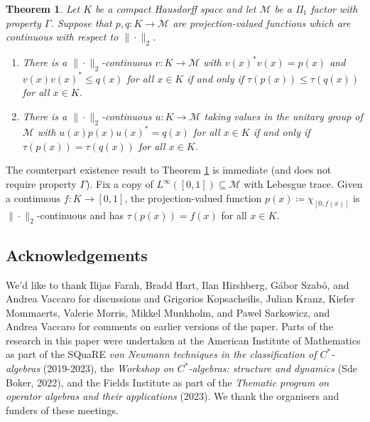 \documentclass[a4paper,11pt]{amsart}
\newtheorem{theorem}{Theorem}
\theoremstyle{definition}
\numberwithin{equation}{section}
\numberwithin{theorem}{section}
\newcommand{\M}{\mathcal{M}}
\DeclareRobustCommand{\SkipTocEntry}[5]{}
\begin{document}
\begin{theorem}\label{IntroThmCtsProj}
Let $K$ be a compact Hausdorff space and let $\M$ be a {\rm II}$_1$ factor with property $\Gamma$.  Suppose that $p,q\colon K\to \M$ are projection-valued functions which are continuous with respect to $\|\cdot\|_2$.
\begin{enumerate}
    \item There is a $\|\cdot\|_2$-continuous $v\colon K\to\M$ with $v(x)^*v(x)=p(x)$ and $v(x)v(x)^*\leq q(x)$ for all $x\in K$ if and only if $\tau(p(x))\leq\tau(q(x))$ for all $x\in K$.  
    \item There is a $\|\cdot\|_2$-continuous $u\colon K\to\M$ taking values in the unitary group of $\M$ with $u(x)p(x)u(x)^*=q(x)$ for all $x\in K$ if and only if $\tau(p(x))=\tau(q(x))$ for all $x\in K$. 
\end{enumerate}
\end{theorem}
The counterpart existence result to Theorem \ref{IntroThmCtsProj} is immediate (and does not require property $\Gamma$). Fix a copy of $L^\infty([0,1])\subseteq \M$ with Lebesgue trace.  Given a continuous $f\colon K\to [0,1]$,  the projection-valued function $p(x)\coloneqq \chi_{[0,f(x)]}$ is $\|\cdot\|_2$-continuous and has $\tau(p(x))=f(x)$ for all $x\in K$.

\subsection*{Acknowledgements}
We'd like to thank Ilijas Farah, Bradd Hart, Ilan Hirshberg, G{\'a}bor Szab{\'o}, and Andrea Vaccaro for discussions and Grigorios Kopsacheilis, Julian Kranz, Kiefer Mommaerts, Valerie Morris, Mikkel Munkholm, and Pawel Sarkowicz, and Andrea Vaccaro for comments on earlier versions of the paper.  Parts of the research in this paper were undertaken at the American Institute of Mathematics as part of the SQuaRE \emph{von Neumann techniques in the classification of $C^*$-algebras} (2019-2023), the \emph{Workshop on $C^*$-algebras: structure and dynamics} (Sde Boker, 2022), and the Fields Institute as part of the \emph{Thematic program on operator algebras and their applications} (2023).  We thank the organisers and funders of these meetings.






\tableofcontents 
{} 

\renewcommand{\thetheorem}{\arabic{theorem}}
\end{document}
